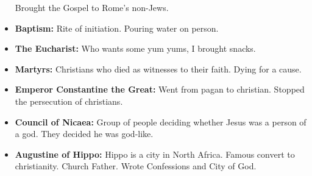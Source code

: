 \documentclass[crop=false,class=book]{standalone}
\begin{document}
\begin{itemize}[noitemsep]
                    Brought the Gospel to Rome’s non-Jews.
                \item \textbf{Baptism:}
                    Rite of initiation. Pouring water on person.
                \item \textbf{The Eucharist:}
                    Who wants some yum yums, I brought snacks.
                \item \textbf{Martyrs:}
                    Christians who died as witnesses to their faith.
                    Dying for a cause.
                \item \textbf{Emperor Constantine the Great:}
                    Went from pagan to christian. Stopped the
                    persecution of christians.
                \item \textbf{Council of Nicaea:}
                    Group of people deciding whether Jesus was a
                    person of a god. They decided he was god-like.
                \item \textbf{Augustine of Hippo:}
                    Hippo is a city in North Africa. Famous convert
                    to christianity. Church Father. Wrote
                    Confessions and City of God.  
            \end{itemize}
\end{document}

